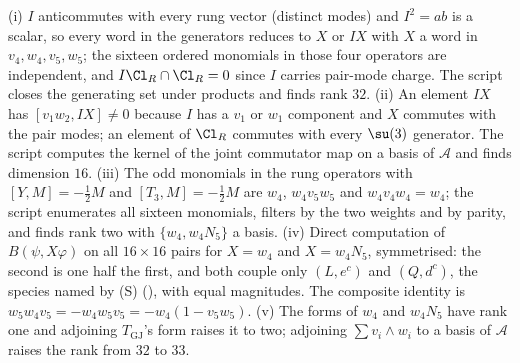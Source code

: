 (i) $I$ anticommutes with every rung vector (distinct modes) and $I^{2} = ab$ is a scalar, so every word in the generators reduces to $X$ or $IX$ with $X$ a word in $v_{4}, w_{4}, v_{5}, w_{5}$; the sixteen ordered monomials in those four operators are independent, and $I\Cl_{R} \cap \Cl_{R} = 0$ since $I$ carries pair-mode charge. The script closes the generating set under products and finds rank $32$. (ii) An element $IX$ has $[v_{1}w_{2}, IX] \ne 0$ because $I$ has a $v_{1}$ or $w_{1}$ component and $X$ commutes with the pair modes; an element of $\Cl_{R}$ commutes with every $\su(3)$ generator. The script computes the kernel of the joint commutator map on a basis of $\mathcal{A}$ and finds dimension $16$. (iii) The odd monomials in the rung operators with $[Y, M] = -\tfrac12 M$ and $[T_{3}, M] = -\tfrac12 M$ are $w_{4}$, $w_{4}v_{5}w_{5}$ and $w_{4}v_{4}w_{4} = w_{4}$; the script enumerates all sixteen monomials, filters by the two weights and by parity, and finds rank two with $\{w_{4}, w_{4}N_{5}\}$ a basis. (iv) Direct computation of $B(\psi, X\varphi)$ on all $16 \times 16$ pairs for $X = w_{4}$ and $X = w_{4}N_{5}$, symmetrised: the second is one half the first, and both couple only $(L, e^{c})$ and $(Q, d^{c})$, the species named by (S) (), with equal magnitudes. The composite identity is $w_{5}w_{4}v_{5} = -w_{4}w_{5}v_{5} = -w_{4}(1 - v_{5}w_{5})$. (v) The forms of $w_{4}$ and $w_{4}N_{5}$ have rank one and adjoining $T_{\mathrm{GJ}}$'s form raises it to two; adjoining $\sum v_{i} \wedge w_{i}$ to a basis of $\mathcal{A}$ raises the rank from $32$ to $33$.

